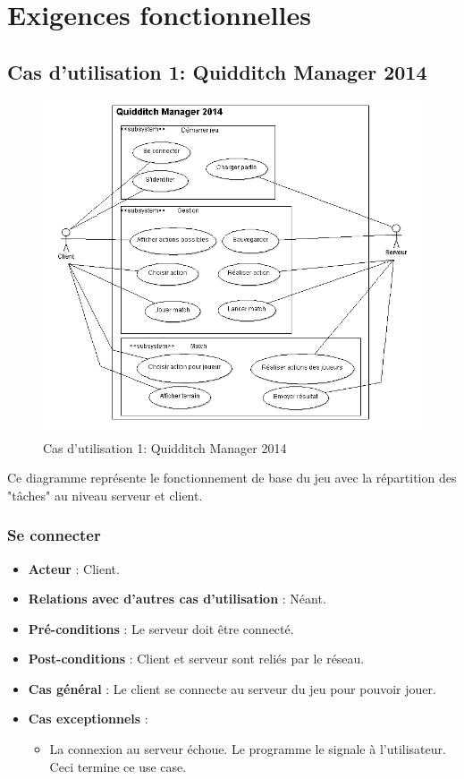\documentclass[a4paper,titlepage]{scrreprt}
\begin{document}
\section{Exigences fonctionnelles}
 \subsection{Cas d'utilisation 1: Quidditch Manager 2014}
  \begin{figure}[H]
    \center
    \includegraphics[scale=0.7]{uml/QM2014.png}
    \caption{Cas d'utilisation 1: Quidditch Manager 2014}
  \end{figure}	
    Ce diagramme représente le fonctionnement de base du jeu avec la répartition des "tâches" au niveau serveur et client.
    \subsubsection{Se connecter}
      \begin{itemize}
        \item \textbf{Acteur} : Client.
        \item \textbf{Relations avec d'autres cas d'utilisation}  : Néant.
        \item \textbf{Pré-conditions} : Le serveur doit être connecté.
        \item \textbf{Post-conditions} : Client et serveur sont reliés par le réseau.
        \item \textbf{Cas général} : Le client se connecte au serveur du jeu pour pouvoir jouer. 
        \item \textbf{Cas exceptionnels} : 
        \begin{itemize}
            \item La connexion au serveur échoue. Le programme le signale à l'utilisateur. Ceci termine ce use case.
          \end{itemize}
      \end{itemize}
\end{document}
